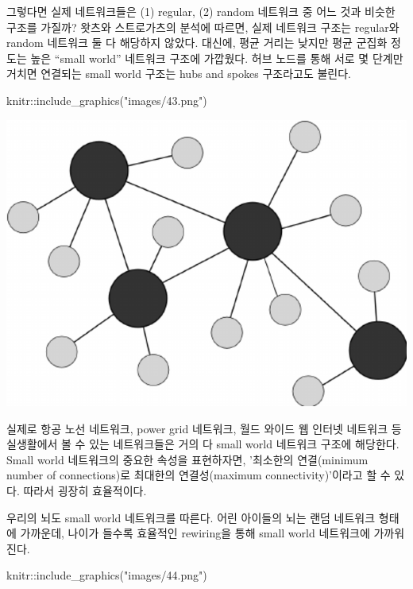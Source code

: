 \documentclass[
]{book}
\newenvironment{Shaded}{\begin{snugshade}}{\end{snugshade}}
\newcommand{\FunctionTok}[1]{\textcolor[rgb]{0.00,0.00,0.00}{#1}}
\newcommand{\NormalTok}[1]{#1}
\newcommand{\SpecialCharTok}[1]{\textcolor[rgb]{0.00,0.00,0.00}{#1}}
\newcommand{\StringTok}[1]{\textcolor[rgb]{0.31,0.60,0.02}{#1}}
\begin{document}
그렇다면 실제 네트워크들은 (1) regular, (2) random 네트워크 중 어느 것과 비슷한 구조를 가질까? 왓츠와 스트로가츠의 분석에 따르면, 실제 네트워크 구조는 regular와 random 네트워크 둘 다 해당하지 않았다. 대신에, 평균 거리는 낮지만 평균 군집화 정도는 높은 ``small world'' 네트워크 구조에 가깝웠다. 허브 노드를 통해 서로 몇 단계만 거치면 연결되는 small world 구조는 hubs and spokes 구조라고도 불린다.

\begin{Shaded}
\begin{Highlighting}[]
\NormalTok{knitr}\SpecialCharTok{::}\FunctionTok{include\_graphics}\NormalTok{(}\StringTok{"images/43.png"}\NormalTok{)}
\end{Highlighting}
\end{Shaded}

\begin{center}\includegraphics[width=0.8\linewidth]{images/43} \end{center}

실제로 항공 노선 네트워크, power grid 네트워크, 월드 와이드 웹 인터넷 네트워크 등 실생활에서 볼 수 있는 네트워크들은 거의 다 small world 네트워크 구조에 해당한다. Small world 네트워크의 중요한 속성을 표현하자면, '최소한의 연결(minimum number of connections)로 최대한의 연결성(maximum connectivity)'이라고 할 수 있다. 따라서 굉장히 효율적이다.

우리의 뇌도 small world 네트워크를 따른다. 어린 아이들의 뇌는 랜덤 네트워크 형태에 가까운데, 나이가 들수록 효율적인 rewiring을 통해 small world 네트워크에 가까워진다.

\begin{Shaded}
\begin{Highlighting}[]
\NormalTok{knitr}\SpecialCharTok{::}\FunctionTok{include\_graphics}\NormalTok{(}\StringTok{"images/44.png"}\NormalTok{)}
\end{Highlighting}
\end{Shaded}
\end{document}
